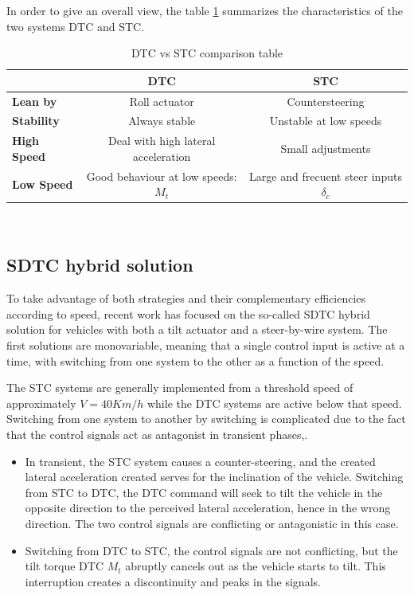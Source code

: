 \newpage
In order to give an overall view, the table \ref{dtc_vs_stc} summarizes the characteristics of the two systems DTC and STC.
\begin{table}[h]
\centering
\caption{DTC vs STC comparison table}
\label{dtc_vs_stc}
	\begin{tabular}{l|c|c|}
	           & \textbf{DTC}                                   & \textbf{STC}                  \\
	\hline        
	\textbf{Lean by}    & Roll actuator                         & Countersteering                 \\
	\textbf{Stability}  & Always stable                         & Unstable at low speeds          \\
	\textbf{High Speed} & Deal with high lateral acceleration   & Small adjustments               \\
	\textbf{Low Speed}  & Good behaviour at low speeds: $M_t$ \Uparrow & Large and frecuent steer inputs $\delta_c$ \Uparrow
	\end{tabular}
	\\[20pt]
\end{table}

\subsection{SDTC hybrid solution}
To take advantage of both strategies and their complementary efficiencies according to speed, recent work has focused on the so-called SDTC hybrid solution for vehicles with both a tilt actuator and a steer-by-wire system. The first solutions are monovariable, meaning that a single control input is active at a time, with switching from one system to the other as a function of the speed. 

The STC systems are generally implemented from a threshold speed of approximately $V=40 Km/h$ while the DTC systems are active below that speed. Switching from one system to another by switching is complicated due to the fact that the control signals act as antagonist in transient phases\cite{doi:10.1080/00423119708969321},\cite{hibbard1996twenty}.
\begin{itemize}
	\begin{itemize}
	\item In transient, the STC system causes a counter-steering, and the created lateral acceleration created serves for the inclination of the vehicle. Switching from STC to DTC, the DTC command will seek to tilt the vehicle in the opposite direction to the perceived lateral acceleration, hence in the wrong direction. The two control signals are conflicting or antagonistic in this case.

	\item Switching from DTC to STC, the control signals are not conflicting, but the tilt torque DTC $M_t$ abruptly cancels out as the vehicle starts to tilt. This interruption creates a discontinuity and peaks in the signals.
	\end{itemize}
\end{itemize}

